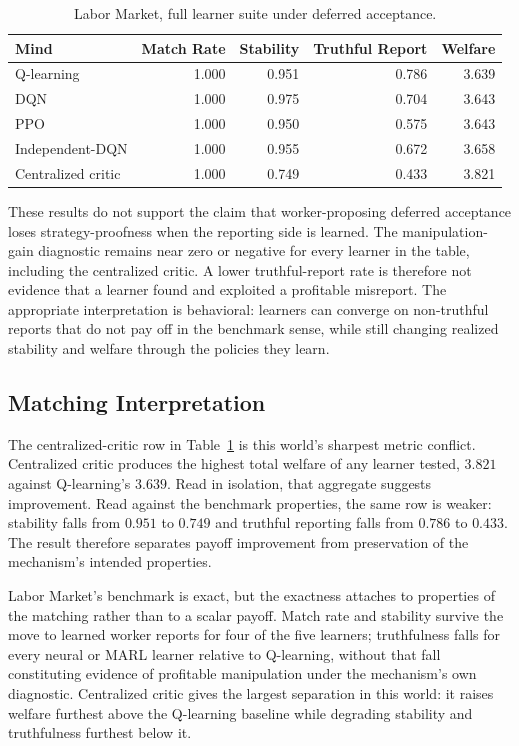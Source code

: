 \documentclass[11pt]{article}
\begin{document}
\begin{table}[h]
\centering
\begin{tabular}{lrrrr}
\toprule
Mind & Match Rate & Stability & Truthful Report & Welfare \\
\midrule
Q-learning & 1.000 & 0.951 & 0.786 & 3.639 \\
DQN & 1.000 & 0.975 & 0.704 & 3.643 \\
PPO & 1.000 & 0.950 & 0.575 & 3.643 \\
Independent-DQN & 1.000 & 0.955 & 0.672 & 3.658 \\
Centralized critic & 1.000 & 0.749 & 0.433 & 3.821 \\
\bottomrule
\end{tabular}
\caption{Labor Market, full learner suite under deferred acceptance.}
\label{tab:labor-crossmind}
\end{table}

These results do not support the claim that worker-proposing deferred
acceptance loses strategy-proofness when the reporting side is learned. The
manipulation-gain diagnostic remains near zero or negative for every learner in
the table, including the centralized critic. A lower truthful-report rate is
therefore not evidence that a learner found and exploited a profitable
misreport. The appropriate interpretation is behavioral: learners can converge
on non-truthful reports that do not pay off in the benchmark sense, while still
changing realized stability and welfare through the policies they learn.

\subsection{Matching Interpretation}

The centralized-critic row in Table~\ref{tab:labor-crossmind} is this world's
sharpest metric conflict. Centralized critic produces the highest total welfare
of any learner tested, \(3.821\) against Q-learning's \(3.639\). Read in
isolation, that aggregate suggests improvement. Read against the benchmark
properties, the same row is weaker: stability falls from \(0.951\) to \(0.749\)
and truthful reporting falls from \(0.786\) to \(0.433\). The result therefore
separates payoff improvement from preservation of the mechanism's intended
properties.

Labor Market's benchmark is exact, but the exactness attaches to properties of
the matching rather than to a scalar payoff. Match rate and stability survive
the move to learned worker reports for four of the five learners; truthfulness
falls for every neural or MARL learner relative to Q-learning, without that
fall constituting evidence of profitable manipulation under the mechanism's own
diagnostic. Centralized critic gives the largest separation in this world:
it raises welfare furthest above the Q-learning baseline while degrading
stability and truthfulness furthest below it.
\end{document}
